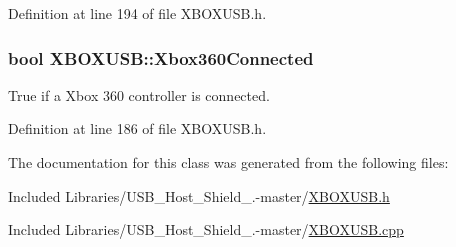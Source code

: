 \-Definition at line 194 of file \-X\-B\-O\-X\-U\-S\-B.\-h.

\hypertarget{class_x_b_o_x_u_s_b_a1c779ae5483a2f73426650242a37d868}{
\subsubsection[{\-Xbox360\-Connected}]{\setlength{\rightskip}{0pt plus 5cm}bool {\bf \-X\-B\-O\-X\-U\-S\-B\-::\-Xbox360\-Connected}}}\label{class_x_b_o_x_u_s_b_a1c779ae5483a2f73426650242a37d868}
\-True if a \-Xbox 360 controller is connected. 

\-Definition at line 186 of file \-X\-B\-O\-X\-U\-S\-B.\-h.



\-The documentation for this class was generated from the following files\-:\begin{DoxyCompactItemize}
\item 
\-Included Libraries/\-U\-S\-B\-\_\-\-Host\-\_\-\-Shield\-\_.-\/master/\hyperlink{_x_b_o_x_u_s_b_8h}{\-X\-B\-O\-X\-U\-S\-B.\-h}\item 
\-Included Libraries/\-U\-S\-B\-\_\-\-Host\-\_\-\-Shield\-\_.-\/master/\hyperlink{_x_b_o_x_u_s_b_8cpp}{\-X\-B\-O\-X\-U\-S\-B.\-cpp}\end{DoxyCompactItemize}
